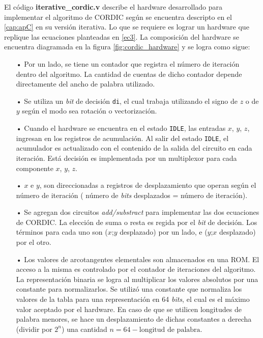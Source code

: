 El código \textbf{iterative\_cordic.v} describe el hardware desarrollado para implementar el algoritmo de CORDIC según se encuentra descripto en el \autoref{cap:apC} en su versión iterativa. Lo que se requiere es lograr un hardware que replique las ecuaciones planteadas en \ref{ec3}. La composición del hardware se encuentra diagramada en la figura \ref{fig:cordic_hardware} y se logra como sigue:

\begin{itemize}
\item[•] Por un lado, se tiene un contador que registra el número de iteración dentro del algoritmo. La cantidad de cuentas de dicho contador depende directamente del ancho de palabra utilizado.
\item[•] Se utiliza un \textit{bit} de decisión \verb;di;, el cual trabaja utilizando el signo de $z$ o de $y$ según el modo sea rotación o vectorización.
\item[•] Cuando el hardware se encuentra en el estado \verb;IDLE;, las entradas $x$, $y$, $z$, ingresan en los registros de acumulación. Al salir del estado \verb;IDLE;, el acumulador es actualizado con el contenido de la salida del circuito en cada iteración. Está decisión es implementada por un multiplexor para cada componente $x$, $y$, $z$.
\item[•] $x$ e $y$, son direccionadas a registros de desplazamiento que operan según el número de iteración ( número de \textit{bits} desplazados = número de iteración).
\item[•] Se agregan dos circuitos \textit{add/substract} para implementar las dos ecuaciones de CORDIC. La elección de suma o resta es regida por el \textit{bit} de decisión. Los términos para cada uno son ($x$;$y$ desplazado) por un lado, e ($y$;$x$ desplazado) por el otro.
\item[•] Los valores de arcotangentes elementales son almacenados en una ROM. El acceso a la misma es controlado por el contador de iteraciones del algoritmo. La representación binaria se logra al multiplicar los valores absolutos por una constante para normalizarlos. Se utilizó una constante que normaliza los valores de la tabla para una representación en 64 \textit{bits}, el cual es el máximo valor aceptado por el hardware. En caso de que se utilicen longitudes de palabra menores, se hace un desplazamiento de dichas constantes a derecha (dividir por $2^n$) una cantidad $n = 64 - \text{longitud de palabra}$.


\end{itemize}
